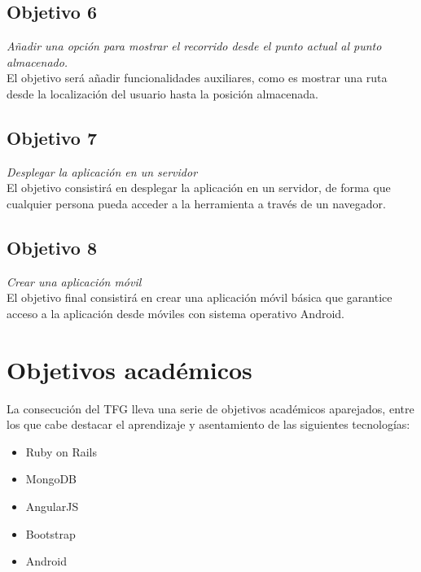 \subsection{Objetivo 6}
\emph{Añadir una opción para mostrar el recorrido desde el punto actual al punto almacenado.}\\
El objetivo será añadir funcionalidades auxiliares, como es mostrar una ruta desde la localización del usuario hasta la posición almacenada.

\subsection{Objetivo 7}
\emph{Desplegar la aplicación en un servidor}\\
El objetivo consistirá en desplegar la aplicación en un servidor, de forma que cualquier persona pueda acceder a la herramienta a través de un navegador.

\subsection{Objetivo 8}
\emph{Crear una aplicación móvil}\\
El objetivo final consistirá en crear una aplicación móvil básica que garantice acceso a la aplicación desde móviles con sistema operativo Android.

\section{Objetivos académicos}
La consecución del \ac{TFG} lleva una serie de objetivos académicos aparejados, entre los que cabe destacar el aprendizaje y asentamiento de las siguientes tecnologías:

\begin{itemize}[label={$\bullet$},labelindent=\parindent,leftmargin=2cm]
	\item Ruby on Rails
	\item MongoDB
	\item AngularJS
	\item Bootstrap
	\item Android
\end{itemize}

